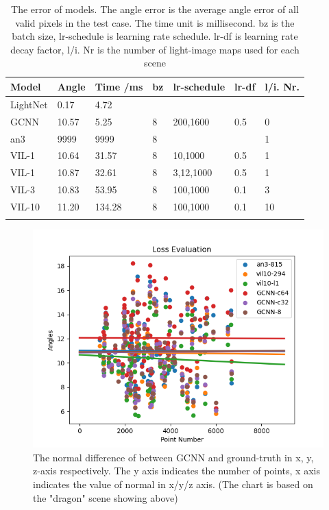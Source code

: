 \documentclass[border=15pt, multi, tikz]{article}
\newcommand{\tabhead}[1]{\textbf{#1}}
\begin{document}
\begin{table}[th]
	
	\centering
	\begin{tabular}{l l l l l l l }
		\toprule
		\tabhead{Model} & \tabhead{Angle} & \tabhead{Time /ms} & \tabhead{bz} & \tabhead{lr-schedule} & \tabhead{lr-df} & \tabhead{l/i. Nr.}\\
		\midrule
		LightNet  & 0.17  & 4.72 & &  & &\\ 
		\hline
		GCNN  & 10.57 & 5.25 & 8 & 200,1600 & 0.5 & 0 \\
		\hline
		an3 & 9999 & 9999 & 8 &  & & 1\\
		\hline
		VIL-1 & 10.64 & 31.57 & 8 & 10,1000 & 0.5 & 1\\
		\hline
		VIL-1 & 10.87 & 32.61 & 8 & 3,12,1000 & 0.5 & 1\\
		\hline
		VIL-3  & 10.83 & 53.95 & 8 & 100,1000 & 0.1 & 3\\
		\hline
		VIL-10  & 11.20 & 134.28 & 8 & 100,1000 & 0.1 &10\\
		\bottomrule\\
	\end{tabular}
	\caption{The error of models. The angle error is the average angle error of all valid pixels in the test case. The time unit is millisecond. bz is the batch size, lr-schedule is learning rate schedule. lr-df is learning rate decay factor, l/i. Nr is the number of light-image maps used for each scene}	
	\label{tab:model-error}
\end{table}


\begin{figure}[th]
	\centering
	\includegraphics[width=\linewidth]{./Figures/regression-comparison.png}
	\caption{The normal difference of between GCNN and ground-truth in x, y, z-axis respectively. The y axis indicates the number of points, x axis indicates the value of normal in x/y/z axis. (The chart is based on the "dragon" scene showing above)}
	\label{fig:normal-histo-diff}
\end{figure}
\end{document}
